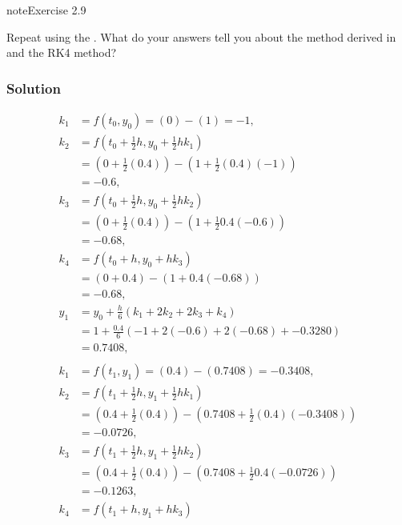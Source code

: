 \documentclass[letterpaper,10pt,english]{jupyterBook}
\begin{document}
\begin{sphinxadmonition}{note}{Exercise 2.9}

\sphinxAtStartPar
Repeat {\hyperref[\detokenize{2_ERKs/2.5_ERK_Exercises:ex2-8}]{}} using the {\hyperref[\detokenize{2_ERKs/2.2_RK4_Derivation:rk4-definition}]{}}. What do your answers tell you about the method derived in {\hyperref[\detokenize{2_ERKs/2.5_ERK_Exercises:ex2-5}]{}} and the RK4 method?
\subsubsection*{Solution}
\begin{align*}
    k_1 &= f(t_0, y_0) = (0) - (1) = -1, \\
    k_2 &= f(t_0 + \tfrac{1}{2}h, y_0 + \tfrac{1}{2}hk_1) \\
    &= (0 + \tfrac{1}{2}(0.4)) - (1 + \tfrac{1}{2}(0.4)(-1)) \\
    &= -0.6, \\
    k_3 &= f(t_0 + \tfrac{1}{2}h, y_0 + \tfrac{1}{2} hk_2) \\
    &= (0 + \tfrac{1}{2}(0.4)) - (1 + \tfrac{1}{2}0.4(-0.6)) \\
    &= -0.68, \\
    k_4 &= f(t_0 + h, y_0 + hk_3) \\
    &= (0 + 0.4) - (1 + 0.4(-0.68)) \\
    &= -0.68, \\
    y_1 &= y_0 + \frac{h}{6} (k_1 + 2 k_2 + 2 k_3 + k_4) \\
    &= 1 + \frac{0.4}{6} (-1 + 2(-0.6) + 2(-0.68) + -0.3280) \\
    &= 0.7408, \\
    \\
    k_1 &= f(t_1, y_1) = (0.4) - (0.7408) = -0.3408, \\
    k_2 &= f(t_1 + \tfrac{1}{2}h, y_1 + \tfrac{1}{2}hk_1) \\
    &= (0.4 + \tfrac{1}{2}(0.4)) - (0.7408 + \tfrac{1}{2}(0.4)(-0.3408)) \\
    &= -0.0726, \\
    k_3 &= f(t_1 + \tfrac{1}{2}h, y_1 + \tfrac{1}{2} hk_2) \\
    &= (0.4 + \tfrac{1}{2}(0.4)) - (0.7408 + \tfrac{1}{2}0.4(-0.0726)) \\
    &= -0.1263, \\
    k_4 &= f(t_1 + h, y_1 + hk_3) \\

\end{align*}
\end{sphinxadmonition}
\end{document}
